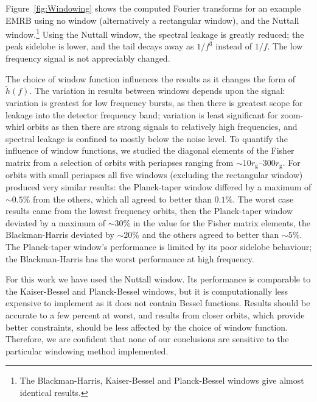 \documentclass[useAMS,usedcolumn,usegraphicx,usenatbib]{mn2e}
\newcommand{\Figref}[1]{Figure~\ref{fig:#1}}
\newcommand{\sub}[1]{\ensuremath{_\mathrm{#1}}}
\begin{document}
\Figref{Windowing} shows the computed Fourier transforms for an example EMRB using no window (alternatively a rectangular window), and the Nuttall window.\footnote{The Blackman-Harris, Kaiser-Bessel and Planck-Bessel windows give almost identical results.} Using the Nuttall window, the spectral leakage is greatly reduced; the peak sidelobe is lower, and the tail decays away as $1/{f^3}$ instead of $1/{f}$. The low frequency signal is not appreciably changed.

The choice of window function influences the results as it changes the form of $\widetilde{h}(f)$. The variation in results between windows depends upon the signal: variation is greatest for low frequency bursts, as then there is greatest scope for leakage into the detector frequency band; variation is least significant for zoom-whirl orbits as then there are strong signals to relatively high frequencies, and spectral leakage is confined to mostly below the noise level. To quantify the influence of window functions, we studied the diagonal elements of the Fisher matrix from a selection of orbits with periapses ranging from $\sim 10 r\sub{g}$--$300 r\sub{g}$. For orbits with small periapses all five windows (excluding the rectangular window) produced very similar results: the Planck-taper window differed by a maximum of $\sim 0.5\%$ from the others, which all agreed to better than $0.1\%$. The worst case results came from the lowest frequency orbits, then the Planck-taper window deviated by a maximum of $\sim 30\%$ in the value for the Fisher matrix elements, the Blackman-Harris deviated by $\sim 20\%$ and the others agreed to better than $\sim 5\%$. The Planck-taper window's performance is limited by its poor sidelobe behaviour; the Blackman-Harris has the worst performance at high frequency.

For this work we have used the Nuttall window. Its performance is comparable to the Kaiser-Bessel and Planck-Bessel windows, but it is computationally less expensive to implement as it does not contain Bessel functions. Results should be accurate to a few percent at worst, and results from closer orbits, which provide better constraints, should be less affected by the choice of window function. Therefore, we are confident that none of our conclusions are sensitive to the particular windowing method implemented.

\bsp

\label{lastpage}
\end{document}
